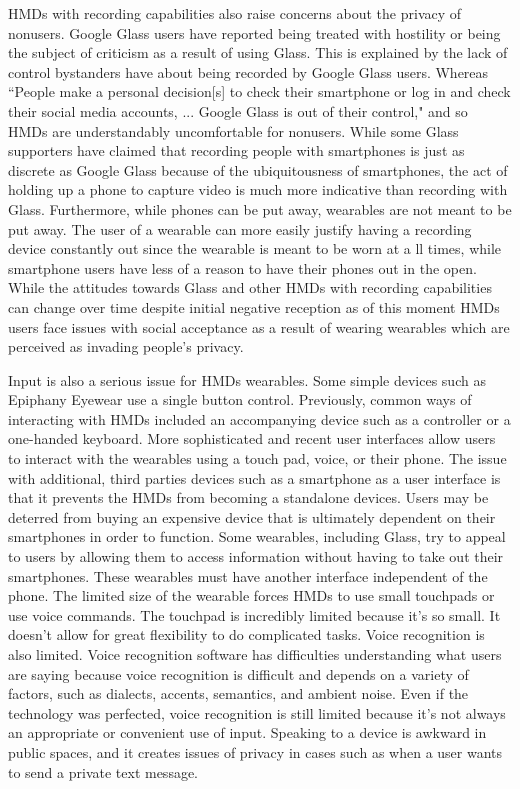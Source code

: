 \documentclass[11pt]{article}
\begin{document}
HMDs with recording capabilities also raise concerns about the privacy of nonusers. Google Glass users have reported being treated with hostility or being the subject of criticism as a result of using Glass\cite{fromCyborgsToGG}\cite{negativeGlassReactions}. This is explained by the lack of control bystanders have about being recorded by Google Glass users. Whereas ``People make a personal decision[s] to check their smartphone or log in and check their social media accounts, ... Google Glass is out of their control," and so HMDs are understandably uncomfortable for nonusers. While some Glass supporters have claimed that recording people with smartphones is just as discrete as Google Glass because of the ubiquitousness of smartphones, the act of holding up a phone to capture video is much more indicative than recording with Glass. Furthermore, while phones can be put away, wearables are not meant to be put away. The user of a wearable can more easily justify having a recording device constantly out since the wearable is meant to be worn at a ll times, while smartphone users have less of a reason to have their phones out in the open. While the attitudes towards Glass and other HMDs with recording capabilities can change over time despite initial negative reception\cite{changingAttitudes} as of this moment HMDs users face issues with social acceptance as a result of wearing wearables which are perceived as invading people's privacy.

Input is also a serious issue for HMDs wearables. Some simple devices such as Epiphany Eyewear use a single button control. Previously, common ways of interacting with HMDs included an accompanying device such as a controller or a one-handed keyboard\cite{inputForHDMs}. More sophisticated and recent user interfaces allow users to interact with the wearables using a  touch pad, voice, or their phone\cite{inputForHDMs}\cite{glassHelp}\cite{userInteractionMultipleDisplays}. The issue with additional, third parties devices such as a smartphone as a user interface is that it prevents the HMDs from becoming a standalone devices. Users may be deterred from buying an expensive device that is ultimately dependent on their smartphones in order to function. Some wearables, including Glass, try to appeal to users by allowing them to access information without having to take out their smartphones. These wearables must have another interface independent of the phone. The limited size of the wearable forces HMDs to use small touchpads or use voice commands. The touchpad is incredibly limited because it's so small. It doesn't allow for great flexibility to do complicated tasks. Voice recognition is also limited. Voice recognition software has difficulties understanding what users are saying because voice recognition is difficult and depends on a variety of factors, such as dialects, accents, semantics, and ambient noise\cite{voiceRecognitionTroubles}. Even if the technology was perfected, voice recognition is still limited because it's not always an appropriate or convenient use of input. Speaking to a device is awkward in public spaces, and it creates issues of privacy in cases such as when a user wants to send a private text message.
\end{document}
